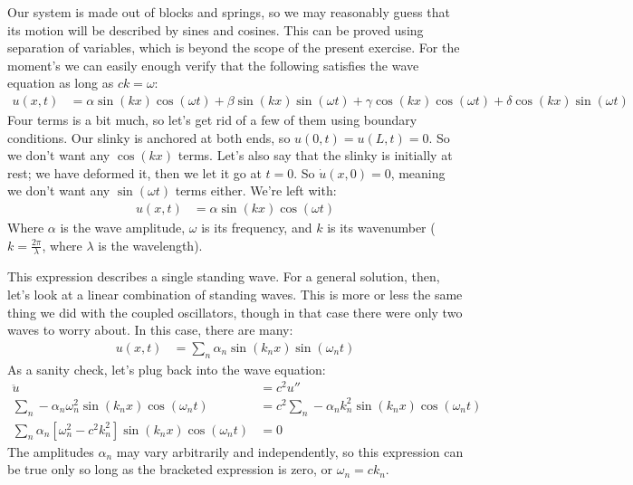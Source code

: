 \documentclass{article}
\begin{document}
Our system is made out of blocks and springs, so we may reasonably guess that its motion will be described by sines and cosines. This can be proved using separation of variables, which is beyond the scope of the present exercise. For the moment's we can easily enough verify that the following satisfies the wave equation as long as $ck = \omega$:
\begin{align*}
    u(x, t) &= 
        \alpha \sin (kx) \cos (\omega t) +
        \beta \sin (kx) \sin (\omega t) + 
        \gamma \cos (kx) \cos (\omega t) +
        \delta \cos (kx) \sin (\omega t)
\end{align*}
Four terms is a bit much, so let's get rid of a few of them using boundary conditions. Our slinky is anchored at both ends, so ${u(0, t)=u(L, t)=0}$. So we don't want any $\cos(kx)$ terms. Let's also say that the slinky is initially at rest; we have deformed it, then we let it go at $t=0$. So $\dot{u}(x, 0)=0$, meaning we don't want any $\sin(\omega t)$ terms either. We're left with:
\begin{align*}
    u(x, t) &= 
        \alpha \sin (kx) \cos (\omega t)
\end{align*}
Where $\alpha$ is the wave amplitude, $\omega$ is its frequency, and $k$ is its wavenumber ($k=\tfrac{2\pi}{\lambda}$, where $\lambda$ is the wavelength). 

This expression describes a single standing wave. For a general solution, then, let's look at a linear combination of standing waves. This is more or less the same thing we did with the coupled oscillators, though in that case there were only two waves to worry about. In this case, there are many:
\begin{align*}
    u(x, t) &= \displaystyle\sum_n \alpha_n \sin \left( k_n x \right) \sin \left( \omega_n t \right)
\end{align*}
As a sanity check, let's plug back into the wave equation:
\begin{align*}
    \ddot{u} &= c^2 u'' \\
    \displaystyle\sum_n -\alpha_n \omega_n^2 \sin \left( k_n x \right) \cos \left( \omega_n t \right)
    &= 
    c^2 \displaystyle\sum_n -\alpha_n k_n^2 \sin \left( k_n x \right) \cos \left( \omega_n t \right) \\
    \displaystyle\sum_n \alpha_n \left[ \omega_n^2 - c^2 k_n^2 \right] \sin \left( k_n x \right) \cos \left( \omega_n t \right)
    &= 0  
\end{align*}
The amplitudes $\alpha_n$ may vary arbitrarily and independently, so this expression can be true only so long as the bracketed expression is zero, or $\omega_n=ck_n$.
\end{document}
